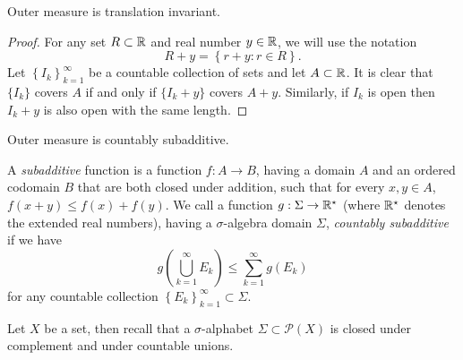 
\begin{proposition}[]
	Outer measure is translation invariant.
\end{proposition}

\begin{proof}
	For any set $R \subset \mathbb{R}$ and real number $y \in \mathbb{R}$, 
	we will use the notation
	\[
		R + y = \left\{
			r + y: r \in R
		\right\}.
	\]
	Let $\left\{
		I_k
	\right\}_{k=1}^\infty$
	be a countable collection of sets and let $A \subset \mathbb{R}$.
	It is clear that $\{I_k\}$ covers $A$ if and only if
	$\{I_k + y\}$ covers $A + y$.
	Similarly, if $I_k$ is open then $I_k + y$ is also open
	with the same length.
\end{proof}

\begin{proposition}[]
	Outer measure is countably subadditive.
\end{proposition}

A \emph{subadditive} function is a function $f: A \to B$,
having a domain $A$ and an ordered codomain $B$ that are both closed
under addition, such that for every $x, y \in A$,
$f(x + y) \leq f(x) + f(y)$.
We call a function $g: \Sigma \to \mathbb{R}^\star$ (where $\mathbb{R}^\star$ denotes
the extended real numbers), having a $\sigma$-algebra domain $\Sigma$,
\emph{countably subadditive} if  we have
\[
	g\left( 
		\bigcup_{k=1}^\infty E_k
	\right) \leq
	\sum^{\infty}_{k=1} g(E_k)
\]
for any countable collection
$\left\{
	E_k
\right\}_{k=1}^\infty \subset \Sigma$.

Let $X$ be a set, then recall that a $\sigma$-alphabet 
$\Sigma \subset \mathcal P(X)$ is closed under complement and under
countable unions.

